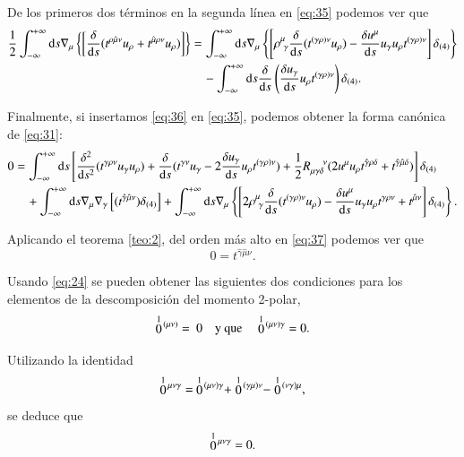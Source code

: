 De los primeros dos términos en la segunda línea en \eqref{eq:35} podemos ver que
\begin{align}
\nonumber
\frac{1}{2} \int_{-\infty}^{+\infty} \mathrm{d}s \nabla_{\mu} \left\{ \left[ \frac{\delta }{\mathrm{d}s}( t^{\rho \hat{\mu} \nu} u_{\rho} + t^{\hat{\mu} \rho \nu} u_{\rho}) \right] \right\} &= 
\int_{-\infty}^{+\infty} \mathrm{d}s \nabla_{\mu} \left\{ \left[ \rho^{\mu}_{\ \gamma} \frac{\delta }{\mathrm{d}s}( t^{(\gamma \rho) \nu} u_{\rho} ) - \frac{\delta u^{\mu}}{\mathrm{d}s} u_{\gamma} u_{\rho} t^{(\gamma \rho) \nu} \right] \delta_{(4)} \right\} \\ 
\label{eq:36}
& \quad - \int_{-\infty}^{+\infty} \mathrm{d}s \frac{\delta }{\mathrm{d}s} \left( \frac{\delta u_{\gamma}}{\mathrm{d}s} u_{\rho} t^{(\gamma \rho) \nu} \right) \delta_{(4)}.
\end{align}

Finalmente, si insertamos \eqref{eq:36} en \eqref{eq:35}, podemos obtener la forma canónica de \eqref{eq:31}:
\begin{align}
\nonumber
0 &= \int_{-\infty}^{+\infty} \mathrm{d}s \left[ \frac{\delta^2}{\mathrm{d}s^2} (t^{\gamma \rho \nu} u_{\gamma}u_{\rho}) + \frac{\delta }{\mathrm{d}s} (t^{\gamma \nu} u_{\gamma} - 2\frac{\delta u_{\gamma}}{\mathrm{d}s} u_{\rho} t^{(\gamma \rho) \nu}) + \frac{1}{2} R^{\ \ \ \ \nu}_{\mu \gamma \delta} (2 u^{\mu} u_{\rho} t^{\hat{\gamma} \rho \delta} + t^{\hat{\gamma} \hat{\mu} \delta}) \right] \delta_{(4)} \\ 
\label{eq:37}
& \quad + \int_{-\infty}^{+\infty} \mathrm{d}s \nabla_{\mu} \nabla_{\gamma} \left[ ( t^{\hat{\gamma} \hat{\mu} \nu} )\delta_{(4)} \right] + \int_{-\infty}^{+\infty} \mathrm{d}s \nabla_{\mu} \left\{ \left[ 2 \rho^{\mu}_{\ \gamma} \frac{\delta }{\mathrm{d}s}( t^{(\gamma \rho) \nu} u_{\rho} ) - \frac{\delta u^{\mu}}{\mathrm{d}s} u_{\gamma} u_{\rho} t^{\gamma \rho \nu} + t^{\hat{\mu} \nu} \right] \delta_{(4)} \right\}.
\end{align}

Aplicando el teorema \ref{teo:2}, del orden más alto en \eqref{eq:37} podemos ver que
\begin{equation}
0 =  t^{\hat{\gamma} \hat{\mu} \nu}.
\end{equation}

Usando \eqref{eq:24} se pueden obtener las siguientes dos condiciones para los elementos de la descomposición del momento 2-polar,
\begin{equation}
\label{eq:38}
\stackrel{1}{0}{\!}^{(\mu \nu)} = \ 0 \quad \mathrm{y \ que} \quad \stackrel{1}{0}{\!}^{(\mu \nu) \gamma} = 0.
\end{equation}

Utilizando la identidad
\begin{equation}
\stackrel{1}{0}{\!}^{\mu \nu \gamma} = \ \stackrel{1}{0}{\!}^{(\mu \nu) \gamma} + \stackrel{1}{0}{\!}^{(\gamma \mu) \nu} - \stackrel{1}{0}{\!}^{(\nu \gamma) \mu},
\end{equation}
se deduce que
\begin{equation}
\label{eq:39}
\stackrel{1}{0}{\!}^{\mu \nu \gamma} = 0.
\end{equation}

